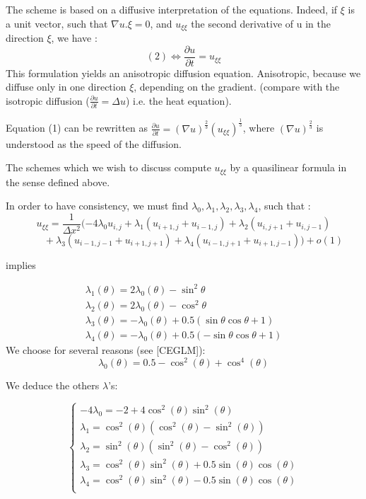 The scheme is based on a diffusive interpretation of the equations.
Indeed, if $\xi$ is a unit vector, such that $\nabla u . \xi = 0$,
and $u_{\xi\xi}$ the second derivative of u in the direction $\xi$,
we have :
$$ (2) \Leftrightarrow \frac{\partial u}{\partial t} = u_{\xi\xi} $$
This formulation yields an anisotropic diffusion equation. Anisotropic,
because we diffuse only in one direction $\xi$, depending on the gradient.
(compare with the isotropic diffusion ($\frac{\partial u}{\partial t} = \Delta u$) i.e. the
heat equation).

Equation (1) can be rewritten as
$ \frac{\partial u}{\partial t} = ( \nabla u )^{\frac{2}{3}} (u_{\xi\xi})^{\frac{1}{3}} $,
where $( \nabla u )^{\frac{2}{3}}$ is understood as the speed of the diffusion.


The schemes which we wish to discuss compute $u_{\xi\xi}$ by a quasilinear formula in the sense defined above.

\skipaline
In order to have consistency, we must find $\lambda_0 , \lambda_1 , \lambda_2 ,
\lambda_3, \lambda_4$, such that :
\begin{equation} \label{KKK}
u_{\xi\xi} = \frac{1}{\Delta x^2} ( -4 \lambda_0 u_{i,j} + \lambda_1 (u_{i+1,j}
+u_{i-1,j}) + \lambda_2 (u_{i,j+1} +u_{i,j-1})
\end{equation}
$$
    \qquad + \lambda_3 (u_{i-1,j-1} +u_{i+1,j+1}) +\lambda_4 (u_{i-1,j+1} +u_{i+
1,j-1}))
+o(1)
$$

\CONS implies

$$
\begin{array}{l}
 \lambda_1(\theta) = 2 \lambda_0(\theta) - \sin^2\theta \\
 \lambda_2(\theta) = 2 \lambda_0(\theta) - \cos^2\theta \\
 \lambda_3(\theta) = - \lambda_0(\theta) + 0.5(\sin \theta \cos \theta + 1) \\
 \lambda_4(\theta) = - \lambda_0(\theta) + 0.5(-\sin \theta \cos \theta + 1) 
 \end{array}
$$
We choose for several reasons (see [CEGLM]):
$$ \lambda_0(\theta) = 0.5 - \cos^2(\theta) +\cos^4(\theta) $$

We deduce the others $\lambda$'s:

$$
\left\{
\begin{array}{l}
-4 \lambda_0 = -2 + 4 \cos^2(\theta)\sin^2(\theta) \\
\lambda_1 = \cos^2(\theta) (\cos^2(\theta) - \sin^2(\theta)) \\
\lambda_2 = \sin^2(\theta) (\sin^2(\theta) - \cos^2(\theta)) \\
\lambda_3 = \cos^2(\theta)\sin^2(\theta) + 0.5 \sin(\theta)\cos(\theta) \\
\lambda_4 = \cos^2(\theta)\sin^2(\theta) - 0.5 \sin(\theta)\cos(\theta) \\
\end{array}
\right.
$$


